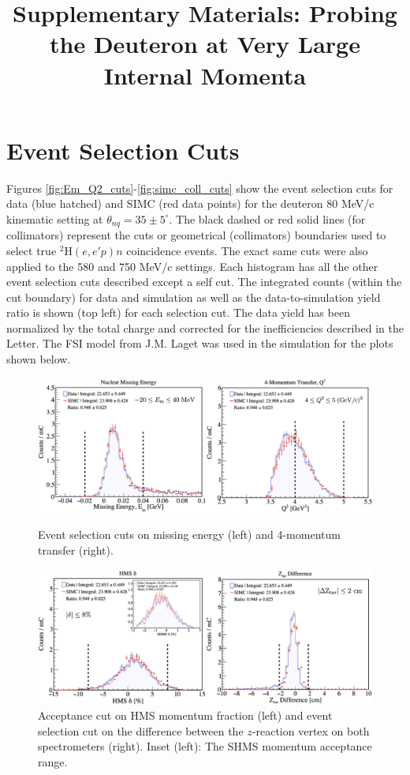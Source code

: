 \documentclass[aps, prl]{revtex4-2}  %
\begin{document}
\title{Supplementary Materials: Probing the Deuteron at Very Large Internal Momenta}
\maketitle
\section{\large Event Selection Cuts}
\noindent Figures \ref{fig:Em_Q2_cuts}-\ref{fig:simc_coll_cuts} show the event selection cuts for data (blue hatched) and SIMC (red data points) for the deuteron 80 MeV/c kinematic setting at $\theta_{nq}=35\pm5^{\circ}$.
The black dashed or red solid lines (for collimators) represent the cuts or geometrical (collimators) boundaries used to select true $^{2}$H$(e,e'p)n$ coincidence events.
The exact same cuts were also applied to the 580 and 750 MeV/c settings. Each histogram has all the other event selection cuts described except a self cut.
The integrated counts (within the cut boundary) for data and simulation as well as the data-to-simulation yield ratio is shown (top left) for each selection cut.
The data yield has been normalized by the total charge and corrected for the inefficiencies described in the Letter. The FSI model from J.M. Laget was used in the simulation for the plots shown below.
\begin{figure}[!h]
\includegraphics[scale=0.24]{plots/Em_and_Q2_CUT_80MeV_35deg.png}
\caption{Event selection cuts on missing energy (left) and 4-momentum transfer (right).}
\label{fig:Em_Q2_cuts}
\includegraphics[scale=0.24]{plots/deltaAcc_and_ZtarCUT_80MeV_35deg.png}
\caption{Acceptance cut on HMS momentum fraction (left) and event selection cut on the difference between the $z$-reaction vertex on both spectrometers (right).
  Inset (left): The SHMS momentum acceptance range.}
\label{fig:delta_Ztar_cuts}
\end{figure}\\
\end{document}
